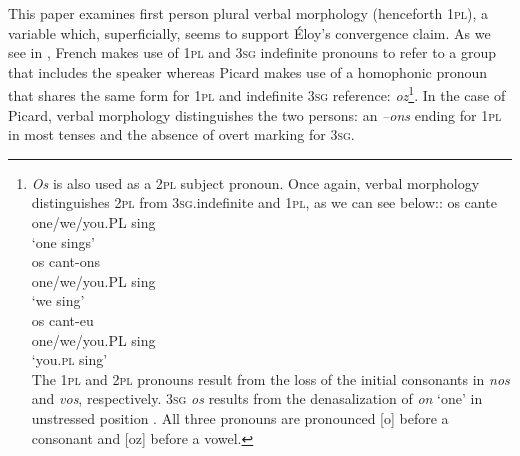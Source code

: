\documentclass[output=paper,colorlinks,citecolor=brown]{langscibook}
\begin{document}
This paper examines first person plural verbal morphology (henceforth 1\textsc{pl}), a variable which, superficially, seems to support Éloy’s convergence claim. As we see in , French makes use of 1\textsc{pl} and 3\textsc{sg} indefinite pronouns to refer to a group that includes the speaker whereas Picard makes use of a homophonic pronoun that shares the same form for 1\textsc{pl} and indefinite 3\textsc{sg} reference: \textit{oz}\footnote{ \textit{Os} is also used as a 2\textsc{pl} subject pronoun. Once again, verbal morphology distinguishes 2\textsc{pl} from 3\textsc{sg}.indefinite and 1\textsc{pl}, as we can see below::
\ea
\ea
\gll os cante \\
one/we/you.PL sing\\
\glt‘one sings’\\

\ex
\gll os cant-ons \\
one/we/you.PL sing\\
\glt ‘we sing’\\

\ex
\gll os cant-eu \\
one/we/you.PL sing\\
\glt ‘you.\textsc{pl} sing’\\
\z
\z
The 1\textsc{pl} and 2\textsc{pl} pronouns result from the loss of the initial consonants in \textit{nos} and \textit{vos}, respectively. 3\textsc{sg} \textit{os} results from the denasalization of \textit{on} ‘one’ in unstressed position \citep[260--261]{hrkal_grammaire_1910}. All three pronouns are pronounced [o] before a consonant and [oz] before a vowel.}.  In the case of Picard, verbal morphology distinguishes the two persons: an \textit{–ons} ending for 1\textsc{pl} in most tenses and the absence of overt marking for 3\textsc{sg}.
\end{document}

